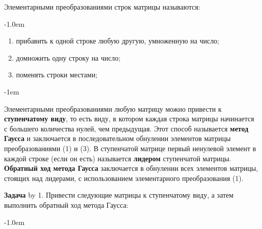 \documentclass[a4paper,10pt]{article}
\def\problem{\textbf{Задача \the\problemnum}\advance\problemnum by 1}
\begin{document}
{Элементарными преобразованиями строк матрицы называются:\par\kern-1.0em
\begin{multicols}{3}
	\begin{enumerate}[label=(\arabic*)\,]
		\item прибавить к одной строке любую другую, умноженную на число;
		\item домножить одну строку на число;
		\item поменять строки местами;
	\end{enumerate}
\end{multicols}\par\kern-1em

Элементарными преобразованиями любую матрицу можно привести к \textbf{ступенчатому виду}, то есть виду, в котором каждая строка матрицы начинается с большего количества нулей, чем предыдущая. Этот способ называется \textbf{метод Гаусса} и заключается в последовательном обнулении элементов матрицы преобразованиями (1) и (3). В ступенчатой матрице первый ненулевой элемент в каждой строке (если он есть) называется \textbf{лидером} ступенчатой матрицы. \textbf{Обратный ход метода Гаусса} заключается в обнулении всех элементов матрицы, стоящих над лидерами, с использованием элементарного преобразования (1).


\problem. Привести следующие матрицы к ступенчатому виду, а затем выполнить обратный ход метода Гаусса: \par\kern-1.0em

}
\end{document}
